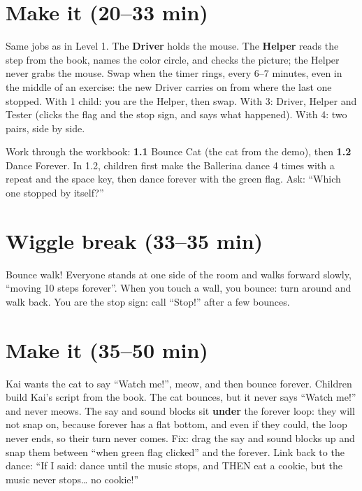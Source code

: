 \section{Make it (20--33 min)}
\begin{pairroles}
Same jobs as in Level 1. The \textbf{Driver} holds the mouse. The \textbf{Helper} reads the step from the book, names the color circle, and checks the picture; the Helper never grabs the mouse. Swap when the timer rings, every 6--7 minutes, even in the middle of an exercise: the new Driver carries on from where the last one stopped. With 1 child: you are the Helper, then swap. With 3: Driver, Helper and Tester (clicks the flag and the stop sign, and says what happened). With 4: two pairs, side by side.
\end{pairroles}

Work through the workbook: \textbf{1.1} Bounce Cat (the cat from the demo), then \textbf{1.2} Dance Forever. In 1.2, children first make the Ballerina dance 4 times with a repeat and the space key, then dance forever with the green flag. Ask: \enquote{Which one stopped by itself?}

\section{Wiggle break (33--35 min)}
Bounce walk! Everyone stands at one side of the room and walks forward slowly, \enquote{moving 10 steps forever}. When you touch a wall, you bounce: turn around and walk back. You are the stop sign: call \enquote{Stop!} after a few bounces.

\section{Make it (35--50 min)}
\begin{bughunt}
Kai wants the cat to say \enquote{Watch me!}, meow, and then bounce forever. Children build Kai's script from the book. The cat bounces, but it never says \enquote{Watch me!} and never meows. The say and sound blocks sit \textbf{under} the forever loop: they will not snap on, because forever has a flat bottom, and even if they could, the loop never ends, so their turn never comes. Fix: drag the say and sound blocks up and snap them between \enquote{when green flag clicked} and the forever. Link back to the dance: \enquote{If I said: dance until the music stops, and THEN eat a cookie, but the music never stops\ldots{} no cookie!}
\end{bughunt}

